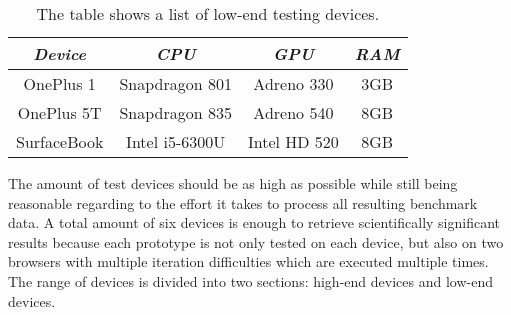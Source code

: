 \begin{table}
  \centering
  \begin{threeparttable}
    \caption{The table shows a list of low-end testing devices.}
    \label{tab:lowendTestingDevices}
    \centering
    \def\rr{\rightskip=0pt plus1em \spaceskip=.3333em \xspaceskip=.5em\relax}
    \setlength{\tabcolsep}{1ex}
    \def\arraystretch{1.20}
    \setlength{\tabcolsep}{1ex}
    \small
    \begin{english}
      \begin{tabular}{|c||c|c|c|}
        \hline
          \multicolumn{1}{|c||}{\emph{Device}}&
          \multicolumn{1}{|c}{\emph{CPU}} &
          \multicolumn{1}{|c}{\emph{GPU}} &
          \multicolumn{1}{|c|}{\emph{RAM}} \\
        \hline
        \hline
        OnePlus 1 & 
        Snapdragon 801 & 
        Adreno 330 & 
        3GB \\
        \hline
        OnePlus 5T & 
        Snapdragon 835 & 
        Adreno 540  & 
        8GB \\
        \hline
        SurfaceBook & 
        Intel i5-6300U & 
        Intel HD 520 & 
        8GB \\
        \hline
      \end{tabular}  
    \end{english}
  \end{threeparttable}
\end{table}

The amount of test devices should be as high as possible while still being reasonable regarding to the effort it takes to process all resulting benchmark data. A total amount of six devices is enough to retrieve scientifically significant results because each prototype is not only tested on each device, but also on two browsers with multiple iteration difficulties which are executed multiple times. The range of devices is divided into two sections: high-end devices and low-end devices. 

